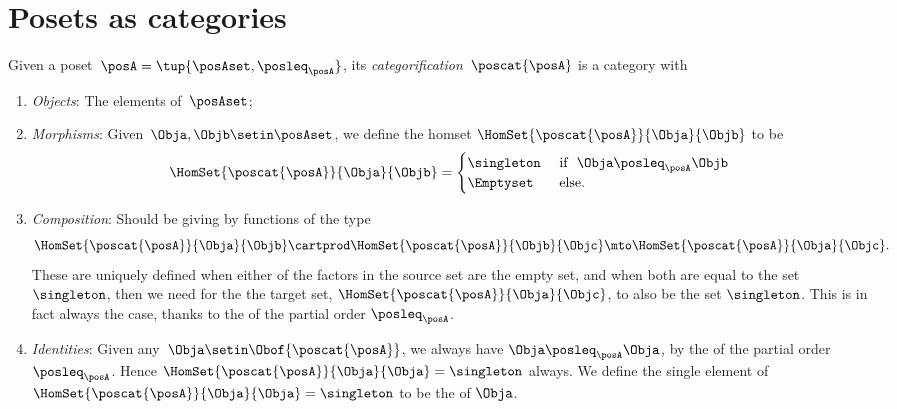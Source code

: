 
\section[Posets as categories]{Posets as categories}
\label{sec:posets-as-cats}

\begin{ctdefinition}\label{def:poscat}
    Given a poset~$\posA = \tup{\posAset, \posleq_\posA}$, its \emph{categorification}~$\poscat{\posA}$ is a category with
    \begin{enumerate}
        \item \emph{Objects}: The elements of~$\posAset$;
        \item \emph{Morphisms}: Given~$\Obja,\Objb\setin \posAset$, we define the homset $\HomSet{\poscat{\posA}}{\Obja}{\Objb}$ to be
        \begin{equation}
\HomSet{\poscat{\posA}}{\Obja}{\Objb} = 
\begin{cases}
\singleton & \text{ if }  \ \Obja \posleq_\posA \Objb \\
\Emptyset & \text{ else. }
\end{cases}
\end{equation}
        \item \emph{Composition}: Should be giving by functions of the type
        \begin{equation}
\HomSet{\poscat{\posA}}{\Obja}{\Objb} \cartprod \HomSet{\poscat{\posA}}{\Objb}{\Objc} \mto \HomSet{\poscat{\posA}}{\Obja}{\Objc}.
\end{equation}
These are uniquely defined when either of the factors in the source set are the empty set, and when both are equal to the set $\singleton$, then we need for the the target set, $\HomSet{\poscat{\posA}}{\Obja}{\Objc}$, to also be the set $\singleton$. This is in fact always the case, thanks to the \emph{} of the partial order $\posleq_\posA$.
        \item \emph{Identities}: Given any~$\Obja \setin \Obof{\poscat{\posA}}$, we always have $\Obja \posleq_\posA \Obja$, by the \emph{} of the partial order $\posleq_\posA$. Hence $\HomSet{\poscat{\posA}}{\Obja}{\Obja} = \singleton$ always. We define the single element of $\HomSet{\poscat{\posA}}{\Obja}{\Obja} = \singleton$ to be the  of $\Obja$. 
    \end{enumerate}
\end{ctdefinition}

